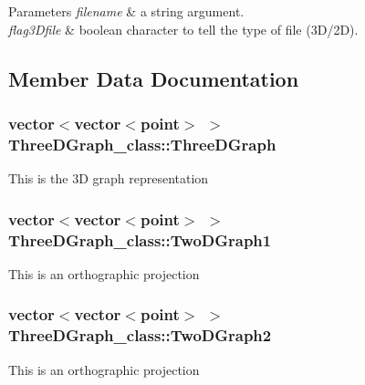 \begin{DoxyParams}{Parameters}
{\em filename} & a string argument. \\
\hline
{\em flag3\+Dfile} & boolean character to tell the type of file (3\+D/2D). \\
\hline
\end{DoxyParams}


\subsection{Member Data Documentation}
\subsubsection[{\texorpdfstring{Three\+D\+Graph}{ThreeDGraph}}]{\setlength{\rightskip}{0pt plus 5cm}vector$<$vector$<${\bf point}$>$ $>$ Three\+D\+Graph\+\_\+class\+::\+Three\+D\+Graph\hspace{0.3cm}{\ttfamily [static]}}\hypertarget{classThreeDGraph__class_a31bf9a08590afa88789cf94892d60699}{}\label{classThreeDGraph__class_a31bf9a08590afa88789cf94892d60699}
This is the 3D graph representation 
\subsubsection[{\texorpdfstring{Two\+D\+Graph1}{TwoDGraph1}}]{\setlength{\rightskip}{0pt plus 5cm}vector$<$vector$<${\bf point}$>$ $>$ Three\+D\+Graph\+\_\+class\+::\+Two\+D\+Graph1\hspace{0.3cm}{\ttfamily [static]}}\hypertarget{classThreeDGraph__class_afa4d483e96f88439024919059fb918c6}{}\label{classThreeDGraph__class_afa4d483e96f88439024919059fb918c6}
This is an orthographic projection 
\subsubsection[{\texorpdfstring{Two\+D\+Graph2}{TwoDGraph2}}]{\setlength{\rightskip}{0pt plus 5cm}vector$<$vector$<${\bf point}$>$ $>$ Three\+D\+Graph\+\_\+class\+::\+Two\+D\+Graph2\hspace{0.3cm}{\ttfamily [static]}}\hypertarget{classThreeDGraph__class_acbdf53881ff18aeb73301dc1b7dc0880}{}\label{classThreeDGraph__class_acbdf53881ff18aeb73301dc1b7dc0880}
This is an orthographic projection 
